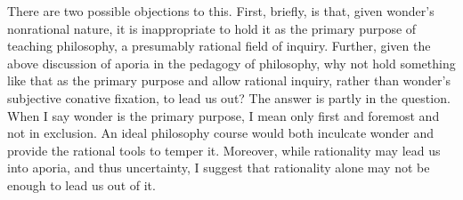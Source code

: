 \documentclass[letterpaper,notitlepage,12pt]{article}
\begin{document}
There are two possible objections to this.
First, briefly, is that, given wonder's nonrational nature, it is inappropriate
to hold it as the primary purpose of teaching philosophy, a presumably rational
field of inquiry.
Further, given the above discussion of aporia in the pedagogy of philosophy, why
not hold something like that as the primary purpose and allow rational inquiry,
rather than wonder's subjective conative fixation, to lead us out?
The answer is partly in the question.
When I say wonder is the primary purpose, I mean only first and foremost and not
in exclusion.
An ideal philosophy course would both inculcate wonder and provide the rational
tools to temper it.
Moreover, while rationality may lead us into aporia, and thus uncertainty, I
suggest that rationality alone may not be enough to lead us out of it.
\end{document}
